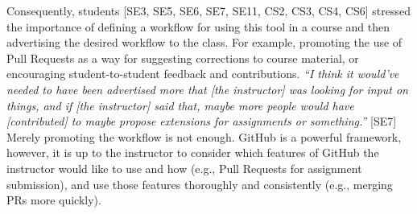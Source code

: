 
Consequently, students [SE3, SE5, SE6, SE7, SE11, CS2, CS3, CS4, CS6] stressed the importance of defining a workflow for using this tool in a course and then advertising the desired workflow to the class. For example, promoting the use of Pull Requests as a way for suggesting corrections to course material, or encouraging student-to-student feedback and contributions. \textit{``I think it would've needed to have been advertised more that [the instructor] was looking for input on things, and if [the instructor] said that, maybe more people would have [contributed] to maybe propose extensions for assignments or something.''} [SE7] Merely promoting the workflow is not enough. GitHub is a powerful framework, however, it is up to the instructor to consider which features of GitHub the instructor would like to use and how (e.g., Pull Requests for assignment submission), and use those features thoroughly and consistently (e.g., merging PRs more quickly).


